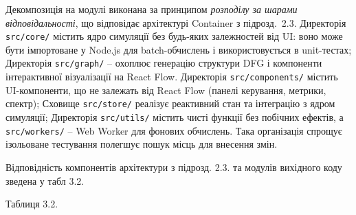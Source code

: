 \documentclass[
]{article}
\begin{document}
Декомпозиція на модулі виконана за принципом \emph{розподілу за шарами
відповідальності}, що відповідає архітектурі Container з підрозд.~2.3.
Директорія \texttt{src}\texttt{/}\texttt{core}\texttt{/} містить ядро
симуляції без будь-яких залежностей від UI: воно може бути імпортоване у
Node.js для batch-обчислень і використовується в unit-тестах; Директорія
\texttt{src}\texttt{/}\texttt{graph}\texttt{/} -- охоплює генерацію
структури DFG і компоненти інтерактивної візуалізації на React Flow.
Директорія \texttt{src}\texttt{/}\texttt{components}\texttt{/} містить
UI-компоненти, що не залежать від React Flow (панелі керування, метрики,
спектр); Сховище \texttt{src}\texttt{/}\texttt{store}\texttt{/} реалізує
реактивний стан та інтеграцію з ядром симуляції; Директорія
\texttt{src}\texttt{/}\texttt{utils}\texttt{/} містить чисті функції без
побічних ефектів, а \texttt{src}\texttt{/}\texttt{workers}\texttt{/} --
Web Worker для фонових обчислень. Така організація спрощує ізольоване
тестування полегшує пошук місць для внесення змін.

Відповідність компонентів архітектури з підрозд. 2.3. та модулів
вихідного коду зведена у табл 3.2.

Таблиця 3.2.
\end{document}
